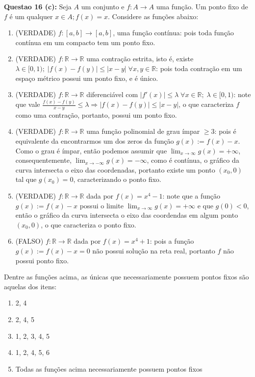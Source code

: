 \documentclass{article}
\begin{document}
\textbf{Questao 16 (c):} Seja  $A$ um conjunto e $f: A \to A$ uma função. Um
ponto fixo de $f$ é um qualquer $x \in A; f(x)=x$. Considere as funções abaixo:
\begin{enumerate}
  \item (VERDADE) $f: [a,b] \to [a,b]$, uma função contínua: pois toda função
  contínua em um compacto tem um ponto fixo.
  
  \item (VERDADE) $f: \mathbb R \to \mathbb R$ uma contração estrita, isto é,
  existe $\lambda \in [0,1); \; |f(x)-f(y)| \leq |x-y| \; \forall x, y \in
  \mathbb R$: pois toda contração em um espaço métrico possui um ponto fixo, e é
  único.
  
  \item (VERDADE) $f: \mathbb R \to \mathbb R$ diferenciável com $|f'(x)| \leq
  \lambda \; \forall x \in \mathbb R; \; \lambda \in [0,1)$: note que vale
  $\frac{f(x)-f(y)}{x-y} \leq \lambda \Rightarrow |f(x)-f(y)| \leq |x-y|$, o que
  caracteriza $f$ como uma contração, portanto, possui um ponto fixo.
  
  \item (VERDADE) $f: \mathbb R \to \mathbb R$ uma função polinomial de grau
  ímpar $\geq 3$: pois é equivalente da encontrarmos um dos zeros da função
  $g(x) := f(x) - x$. Como o grau é ímpar, então podemos assumir que $\lim_{x
  \to \infty} g(x) = +\infty$, consequentemente, $\lim_{x
  \to -\infty} g(x) = -\infty$, como é contínua, o gráfico da curva
  intersecta o eixo das coordenadas, portanto existe um ponto $(x_0,
  0)$ tal que $ g(x_0) = 0$, caracterizando o ponto fixo.
  
  \item (VERDADE) $f: \mathbb R \to \mathbb R$ dada por $f(x) = x^4-1$: note que
  a função $g(x) := f(x) - x$ possui o limite $\lim_{x
  \to \infty} g(x) = +\infty$ e que $g(0) < 0$, então o gráfico da curva
  intersecta o eixo das coordendas em algum ponto $(x_0,
  0)$, o que caracteriza o ponto fixo.
  
  \item (FALSO) $f: \mathbb R \to \mathbb R$ dada por $f(x) = x^4+1$: pois a
  função $g(x) := f(x) - x = 0$ não possui solução na reta real, portanto $f$
  não possui ponto fixo.
\end{enumerate}

Dentre as funções acima, as únicas que necessariamente possuem pontos fixos
são aquelas dos itens:

\begin{enumerate}[label=(\alph*)]
  \item 2, 4
  \item 2, 4, 5
  \item 1, 2, 3, 4, 5
  \item 1, 2, 4, 5, 6
  \item Todas as funções acima necessariamente possuem pontos fixos
\end{enumerate}
\end{document}
